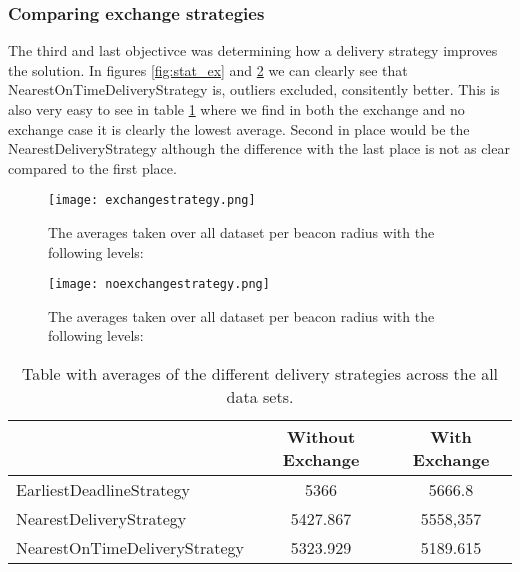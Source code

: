 \documentclass[../main.tex]{subfiles}
\begin{document}
\subsubsection{Comparing exchange strategies}
The third and last objectivce was determining how a delivery strategy improves the solution.
In figures \ref{fig:stat_ex} and \ref{fig:strat_noex} we can clearly see that NearestOnTimeDeliveryStrategy is, outliers excluded, consitently better. 
This is also very easy to see in table \ref{tab:avgstrat} where we find in both the exchange and no exchange case it is clearly the lowest average.
Second in place would be the NearestDeliveryStrategy although the difference with the last place is not as clear compared to the first place.
\begin{figure}
	\centering
	\texttt{[image: exchangestrategy.png]}
	\caption{The averages taken over all dataset per beacon radius with the following levels:}
	\label{fig:strat_ex}
\end{figure}

\begin{figure}
	\centering
	\texttt{[image: noexchangestrategy.png]}
	\caption{The averages taken over all dataset per beacon radius with the following levels:}
	\label{fig:strat_noex}
\end{figure}
\begin{table}
\begin{tabular}{lcc}
	\toprule
	& Without Exchange & With Exchange \\ 
	\midrule
	EarliestDeadlineStrategy & 5366 & 5666.8 \\ 
	NearestDeliveryStrategy & 5427.867 & 5558,357 \\ 
	NearestOnTimeDeliveryStrategy & 5323.929 & 5189.615 \\ 
	\bottomrule
\end{tabular}
\caption{Table with averages of the different delivery strategies across the all data sets.}
\label{tab:avgstrat}
\end{table}
\end{document}
